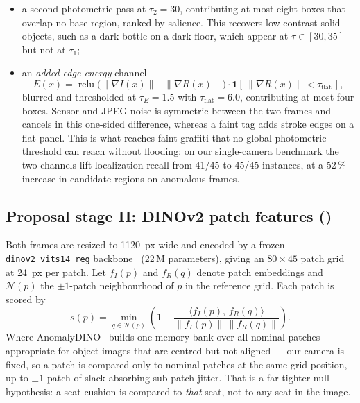 \begin{itemize}
  \item a second photometric pass at $\tau_2 = 30$, contributing at most eight
        boxes that overlap no base region, ranked by salience. This recovers
        low-contrast solid objects, such as a dark bottle on a dark floor,
        which appear at $\tau \in [30,35]$ but not at $\tau_1$;
  \item an \emph{added-edge-energy} channel
        \begin{equation}
          E(x) = \operatorname{relu}\!\bigl(\|\nabla I(x)\| - \|\nabla R(x)\|\bigr)
                 \cdot \mathbf{1}\!\left[\, \|\nabla R(x)\| < \tau_{\mathrm{flat}} \,\right],
          \label{eq:edge}
        \end{equation}
        blurred and thresholded at $\tau_E = 1.5$ with
        $\tau_{\mathrm{flat}} = 6.0$, contributing at most four boxes. Sensor
        and JPEG noise is symmetric between the two frames and cancels in this
        one-sided difference, whereas a faint tag adds stroke edges on a flat
        panel. This is what reaches faint graffiti that no global photometric
        threshold can reach without flooding: on our single-camera benchmark
        the two channels lift localization recall from 41/45 to 45/45
        instances, at a 52\,\% increase in candidate regions on anomalous
        frames.
\end{itemize}

\subsection{Proposal stage II: DINOv2 patch features (\armdino)}
\label{sec:method:dino}

Both frames are resized to 1120~px wide and encoded by a frozen
\texttt{dinov2\_vits14\_reg} backbone~\cite{Oquab_2023} (22\,M parameters),
giving an $80 \times 45$ patch grid at 24~px per patch. Let $f_I(p)$ and
$f_R(q)$ denote patch embeddings and $\mathcal{N}(p)$ the $\pm 1$-patch
neighbourhood of $p$ in the reference grid. Each patch is scored by
%
\begin{equation}
  s(p) = \min_{q \in \mathcal{N}(p)}
         \left( 1 - \frac{\langle f_I(p),\, f_R(q) \rangle}
                          {\|f_I(p)\|\,\|f_R(q)\|} \right).
  \label{eq:dino}
\end{equation}
%
Where AnomalyDINO~\cite{Damm_2025} builds one memory bank over all nominal
patches --- appropriate for object images that are centred but not aligned ---
our camera is fixed, so a patch is compared only to nominal patches at the same
grid position, up to $\pm 1$ patch of slack absorbing sub-patch jitter. That is
a far tighter null hypothesis: a seat cushion is compared to \emph{that} seat,
not to any seat in the image.

